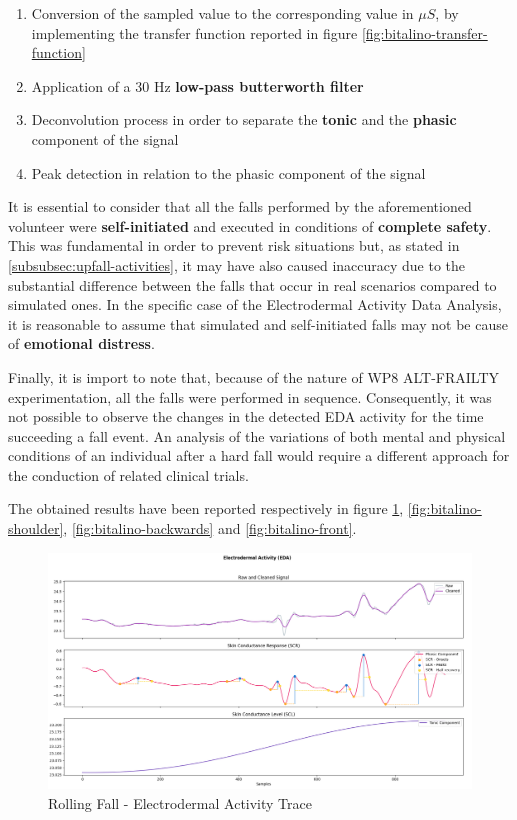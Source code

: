 \begin{enumerate}
    \item Conversion of the sampled value to the corresponding value in $\mu S$, by implementing the transfer function reported in figure \ref{fig:bitalino-transfer-function}
    \item Application of a 30 Hz \textbf{low-pass butterworth filter} 
    \item Deconvolution process in order to separate the \textbf{tonic} and the \textbf{phasic} component of the signal
    \item Peak detection in relation to the phasic component of the signal
\end{enumerate}

It is essential to consider that all the falls performed by the aforementioned volunteer were \textbf{self-initiated} and executed in conditions of \textbf{complete safety}. This was fundamental in order to prevent risk situations but, as stated in \ref{subsubsec:upfall-activities}, it may have also caused inaccuracy due to the substantial difference between the falls that occur in real scenarios compared to simulated ones. In the specific case of the Electrodermal Activity Data Analysis, it is reasonable to assume that simulated and self-initiated falls may not be cause of \textbf{emotional distress}.

Finally, it is import to note that, because of the nature of WP8 ALT-FRAILTY experimentation, all the falls were performed in sequence. Consequently, it was not possible to observe the changes in the detected EDA activity for the time succeeding a fall event. An analysis of the variations of both mental and physical conditions of an individual after a hard fall would require a different approach for the conduction of related clinical trials. 

The obtained results have been reported respectively in figure \ref{fig:bitalino-rolling}, \ref{fig:bitalino-shoulder}, \ref{fig:bitalino-backwards} and \ref{fig:bitalino-front}.

\begin{figure}[H]
    \centering
    \includegraphics[width=\textwidth]{./images/bitalino/Rolling.png}
    \caption{Rolling Fall - Electrodermal Activity Trace}
    \label{fig:bitalino-rolling}
\end{figure}

